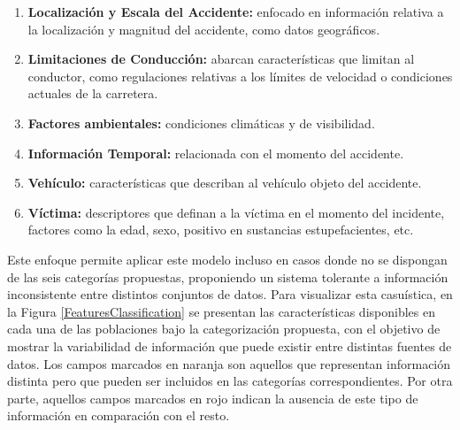 \begin{enumerate}
	\item \textbf{Localización y Escala del Accidente:} enfocado en información relativa a la localización y magnitud del accidente, como datos geográficos.
	\item \textbf{Limitaciones de Conducción:} abarcan características que limitan al conductor, como regulaciones relativas a los límites de velocidad o condiciones actuales de la carretera.
	\item \textbf{Factores ambientales:} condiciones climáticas y de visibilidad.
	\item \textbf{Información Temporal:} relacionada con el momento del accidente.
	\item \textbf{Vehículo:} características que describan al vehículo objeto del accidente.
	\item \textbf{Víctima:} descriptores que definan a la víctima en el momento del incidente, factores como la edad, sexo, positivo en sustancias estupefacientes, etc.
\end{enumerate}

Este enfoque permite aplicar este modelo incluso en casos donde no se dispongan de las seis categorías propuestas, proponiendo un sistema tolerante a información inconsistente entre distintos conjuntos de datos. Para visualizar esta casuística, en la Figura \ref{FeaturesClassification} se presentan las características disponibles en cada una de las poblaciones bajo la categorización propuesta, con el objetivo de mostrar la variabilidad de información que puede existir entre distintas fuentes de datos. Los campos marcados en naranja son aquellos que representan información distinta pero que pueden ser incluidos en las categorías correspondientes. Por otra parte, aquellos campos marcados en rojo indican la ausencia de este tipo de información en comparación con el resto.

